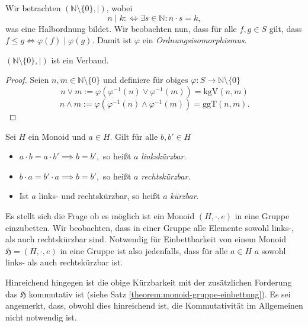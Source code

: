 \begin{remark}
    Wir betrachten $(\mathbb{N} \setminus \{ 0 \}, \mid)$, wobei
    $$ n \mid k :\Leftrightarrow \exists s \in \mathbb{N}: n \cdot s = k, $$
    was eine Halbordnung bildet. Wir beobachten nun, dass für alle $f,g \in S$ gilt, dass $f \leq g \Leftrightarrow \varphi(f) \mid \varphi(g)$. Damit ist $\varphi$ ein \emph{Ordnungsisomorphismus}.
\end{remark}

\begin{corollary}
    $(\mathbb{N}\setminus\{0\}, \mid)$ ist ein Verband.
\end{corollary}

\begin{proof}
    Seien $n,m \in \mathbb{N} \setminus \{0\}$ und definiere für obiges $\varphi:S \to \mathbb{N}\setminus\{0\}$
    $$ n \vee m := \varphi(\varphi^{-1}(n) \vee \varphi^{-1}(m)) = \textrm{kgV}(n,m) $$
    $$ n \wedge m := \varphi(\varphi^{-1}(n) \wedge \varphi^{-1}(m)) = \textrm{ggT}(n,m). $$
\end{proof}

\begin{definition}
    Sei $H$ ein Monoid und $a \in H$. Gilt für alle $b, b' \in H$
    \begin{itemize}
        \item $ a \cdot b = a \cdot b' \implies b = b', $ so heißt $a$ \emph{linkskürzbar}.
        \item $ b \cdot a = b' \cdot a \implies b = b', $ so heißt $a$ \emph{rechtskürzbar}.
        \item Ist $a$ links- und rechtskürzbar, so heißt $a$ \emph{kürzbar}.
    \end{itemize}
\end{definition}

\begin{remark}
    Es stellt sich die Frage ob es möglich ist ein Monoid $(H, \cdot, e)$ in eine Gruppe einzubetten. Wir beobachten, dass in einer Gruppe alle Elemente sowohl links-, als auch rechtskürzbar sind. Notwendig für Einbettbarkeit von einem Monoid $\mathfrak{H} = (H, \cdot, e)$ in eine Gruppe ist also jedenfalls, dass für alle $a \in H$ $a$ sowohl links- als auch rechtskürzbar ist.

    Hinreichend hingegen ist die obige Kürzbarkeit mit der zusätzlichen Forderung das $\mathfrak{H}$ kommutativ ist (siehe Satz \ref{theorem:monoid-gruppe-einbettung}). Es sei angemerkt, dass, obwohl dies hinreichend ist, die Kommutativität im Allgemeinen nicht notwendig ist.
\end{remark}

